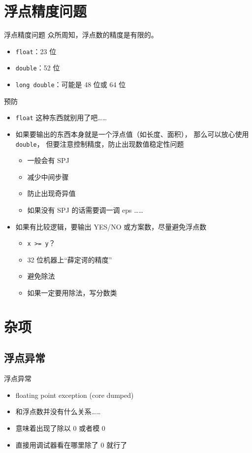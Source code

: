 \documentclass[10pt,mathserif]{beamer}%
\begin{document}
\section{浮点精度问题}
\begin{frame}{浮点精度问题}
	众所周知，浮点数的精度是有限的。
	\begin{itemize}
		\item \lstinline!float!：23 位
		\item \lstinline!double!：52 位
		\item \lstinline!long double!：可能是 48 位或 64 位
	\end{itemize}
\end{frame}

\begin{frame}{预防}
	\begin{itemize}
		\item \lstinline!float! 这种东西就别用了吧……
		\item 如果要输出的东西本身就是一个浮点值（如长度、面积），
			那么可以放心使用 \lstinline!double!，
			但要注意控制精度，防止出现数值稳定性问题
			\begin{itemize}
				\item 一般会有 SPJ
				\item 减少中间步骤
				\item 防止出现奇异值
				\item 如果没有 SPJ 的话需要调一调 eps ……
			\end{itemize}
		\item 如果有比较逻辑，要输出 YES/NO 或方案数，尽量避免浮点数
			\begin{itemize}
				\item \lstinline|x >= y|？
				\item 32 位机器上“薛定谔的精度”
				\item 避免除法
				\item 如果一定要用除法，写分数类
			\end{itemize}
	\end{itemize}
\end{frame}

\section{杂项}
\subsection{浮点异常}
\begin{frame}{浮点异常}
	\begin{itemize}
		\item floating point exception (core dumped)
		\item 和浮点数并没有什么关系……
		\item 意味着出现了除以 $0$ 或者模 $0$
		\item 直接用调试器看在哪里除了 $0$ 就行了
	\end{itemize}
\end{frame}
\end{document}
